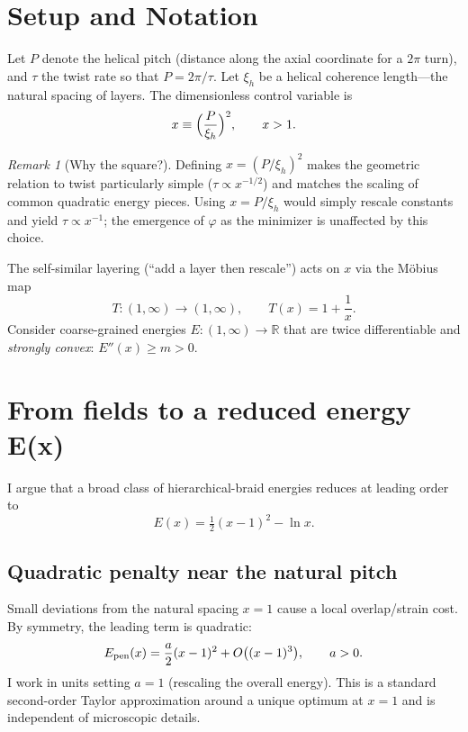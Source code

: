 \documentclass[11pt]{article}
\theoremstyle{remark}
\newtheorem{remark}{Remark}
\theoremstyle{definition}
\newcommand{\R}{\mathbb{R}}
\newcommand{\ph}{\varphi}
\begin{document}
\section{Setup and Notation}
Let $P$ denote the helical pitch (distance along the axial coordinate for a $2\pi$ turn), and $\tau$ the twist rate so that $P=2\pi/\tau$. Let $\xi_h$ be a helical coherence length---the natural spacing of layers. The dimensionless control variable is
\begin{equation}
 x \equiv \Bigl(\frac{P}{\xi_h}\Bigr)^2, \qquad x>1.
 \label{eq:defx}
\end{equation}
\begin{remark}[Why the square?]
Defining $x=(P/\xi_h)^2$ makes the geometric relation to twist particularly simple ($\tau\propto x^{-1/2}$) and matches the scaling of common quadratic energy pieces. Using $x=P/\xi_h$ would simply rescale constants and yield $\tau\propto x^{-1}$; the emergence of $\ph$ as the minimizer is unaffected by this choice.
\end{remark}
The self-similar layering (``add a layer then rescale'') acts on $x$ via the M\"obius map
\begin{equation}
 T:(1,\infty)\to(1,\infty),\qquad T(x)=1+\frac{1}{x}.
 \label{eq:Tmap}
\end{equation}
Consider coarse-grained energies $E:(1,\infty)\to\R$ that are twice differentiable and \emph{strongly convex}: $E''(x)\ge m>0$.

\section{From fields to a reduced energy E(x)}
I argue that a broad class of hierarchical-braid energies reduces at leading order to
\begin{equation}
 E(x)=\tfrac12(x-1)^2-\ln x.
 \label{eq:Ex}
\end{equation}
\subsection{Quadratic penalty near the natural pitch}
Small deviations from the natural spacing $x=1$ cause a local overlap/strain cost. By symmetry, the leading term is quadratic:
\begin{equation}
 E_{\rm pen}(x)=\frac{a}{2}(x-1)^2+O\bigl((x-1)^3\bigr),\qquad a>0.
\end{equation}
I work in units setting $a=1$ (rescaling the overall energy). This is a standard second-order Taylor approximation around a unique optimum at $x=1$ and is independent of microscopic details.
\end{document}
